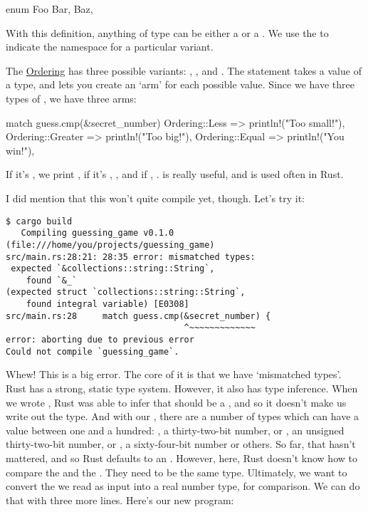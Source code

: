 \begin{rustc}
enum Foo {
  Bar,
  Baz,
}
\end{rustc}

With this definition, anything of type  can be either a  or a . We use the \code{::} 
to indicate the namespace for a particular  variant.

\blank

The \href{https://doc.rust-lang.org/std/cmp/enum.Ordering.html}{Ordering}  has three possible variants: ,
, and . The  statement takes a value of a type, and lets you create an ‘arm’ for each 
possible value. Since we have three types of , we have three arms:

\begin{rustc}
match guess.cmp(&secret_number) {
    Ordering::Less    => println!("Too small!"),
    Ordering::Greater => println!("Too big!"),
    Ordering::Equal   => println!("You win!"),
}
\end{rustc}

If it’s , we print , if it’s , , and if , . 
 is really useful, and is used often in Rust.

\blank

I did mention that this won’t quite compile yet, though. Let’s try it:

\begin{verbatim}
$ cargo build
   Compiling guessing_game v0.1.0 (file:///home/you/projects/guessing_game)
src/main.rs:28:21: 28:35 error: mismatched types:
 expected `&collections::string::String`,
    found `&_`
(expected struct `collections::string::String`,
    found integral variable) [E0308]
src/main.rs:28     match guess.cmp(&secret_number) {
                                   ^~~~~~~~~~~~~~
error: aborting due to previous error
Could not compile `guessing_game`.
\end{verbatim}

Whew! This is a big error. The core of it is that we have ‘mismatched types’. Rust has a strong, static type system. However, it 
also has type inference. When we wrote , Rust was able to infer that  should be a 
, and so it doesn’t make us write out the type. And with our , there are a number of types 
which can have a value between one and a hundred: , a thirty-two-bit number, or , an unsigned thirty-two-bit
number, or , a sixty-four-bit number or others. So far, that hasn’t mattered, and so Rust defaults to an .
However, here, Rust doesn’t know how to compare the  and the . They need to be the same type.
Ultimately, we want to convert the  we read as input into a real number type, for comparison. We can do that with 
three more lines. Here’s our new program:

